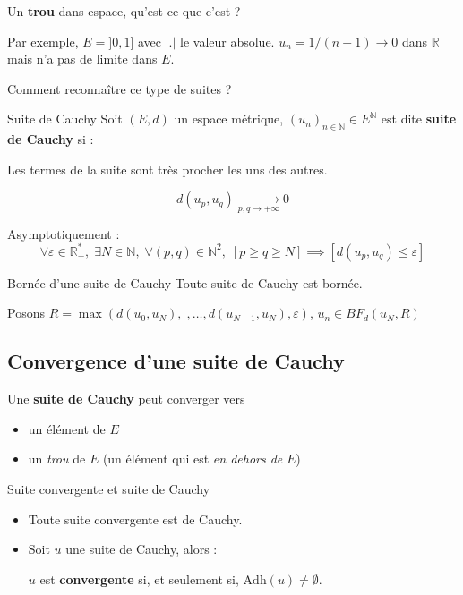 Un \textbf{trou} dans espace, qu'est-ce que c'est ?

Par exemple, $E = ]0, 1]$ avec  $|.|$ le valeur absolue.  $u_n = 1 / (n+1) \to 0$ dans $\mathbb{R} $ mais n'a pas de limite dans $E$.

Comment reconnaître ce type de suites ?

\begin{Definition}[colbacktitle=red!75!black]{Suite de Cauchy}{}
Soit $(E, d)$ un espace métrique,  $(u_n)_{n\in \mathbb{N} }\in E^{\mathbb{N} }$ est dite \textbf{suite de Cauchy} si :
\begin{center}
Les termes de la suite sont très procher les uns des autres.
\end{center}

\[
    d(u_p, u_q) \underset{p,q \to +\infty}{\longrightarrow} 0
\]

Asymptotiquement :
\[
    \forall \varepsilon \in \mathbb{R} _+^{*}, \; \exists N \in \mathbb{N} ,\; \forall (p,q) \in \mathbb{N} ^{2}, \; [p \ge q \ge N] \implies [d(u_p, u_q) \le \varepsilon]
\]

\end{Definition}

\begin{Prop}{Bornée d'une suite de Cauchy}{}
Toute suite de Cauchy est bornée.
\end{Prop}
\begin{myproof}
    Posons $R = \max(d(u_0, u_N),\;, \dots, d(u_{N-1}, u_{N}), \varepsilon)$, $u_n \in BF_d (u_N, R)$
\end{myproof}

\subsection{Convergence d'une suite de Cauchy} %
\label{sub:Convergence d'une suite de Cauchy}

Une \textbf{suite de Cauchy} peut converger vers
\begin{itemize}
    \item un élément de $E$ 
    \item un \textit{trou} de $E$ (un élément qui est \textit{en dehors de} $E$)
\end{itemize}



\begin{Prop}{Suite convergente et suite de Cauchy}{}
\begin{itemize}
    \item Toute suite convergente est de Cauchy.
    \item Soit $u$ une suite de Cauchy, alors :  
      \begin{center}
          $u$ est \textbf{convergente} si, et seulement si, $\mathrm{Adh} (u) \ne \emptyset$.
      \end{center}
\end{itemize}
\end{Prop}

